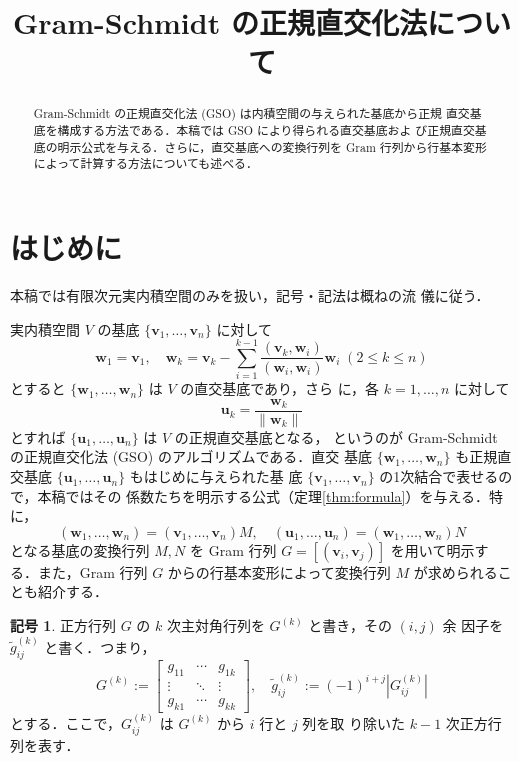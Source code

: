 \documentclass[11pt, uplatex, dvipdfmx]{jsarticle}
\title{Gram-Schmidt の正規直交化法について}
\date{}
\theoremstyle{definition}
\newtheorem*{notation}{記号}
\begin{document}
\maketitle

\begin{abstract}
  Gram-Schmidt の正規直交化法 (GSO) は内積空間の与えられた基底から正規
  直交基底を構成する方法である．本稿では GSO により得られる直交基底およ
  び正規直交基底の明示公式を与える．さらに，直交基底への変換行列を Gram
  行列から行基本変形によって計算する方法についても述べる．
\end{abstract}

\section{はじめに}

本稿では有限次元実内積空間のみを扱い，記号・記法は概ね\cite{miyake}の流
儀に従う．

実内積空間 $V$ の基底 $\{\bm{v}_1, \ldots, \bm{v}_n\}$ に対して
\[
  \bm{w}_1 = \bm{v}_1, \quad \bm{w}_k = \bm{v}_k - \sum_{i=1}^{k-1}
  \frac{(\bm{v}_k, \bm{w}_i)}{(\bm{w}_i, \bm{w}_i)} \bm{w}_i \; (2 \leq k
  \leq n)
\]
とすると $\{\bm{w}_1, \ldots, \bm{w}_n\}$ は $V$ の直交基底であり，さら
に，各 $k=1, \ldots, n$ に対して
\[
  \bm{u}_k = \frac{\bm{w}_k}{\|\bm{w}_k\|}
\]
とすれば $\{\bm{u}_1, \ldots, \bm{u}_n\}$ は $V$ の正規直交基底となる，
というのが Gram-Schmidt の正規直交化法 (GSO) のアルゴリズムである．直交
基底 $\{\bm{w}_1, \ldots, \bm{w}_n\}$ も正規直交基底
$\{\bm{u}_1, \ldots, \bm{u}_n\}$ もはじめに与えられた基
底 $\{\bm{v}_1, \ldots, \bm{v}_n\}$ の1次結合で表せるので，本稿ではその
係数たちを明示する公式（定理\ref{thm:formula}）を与える．特に，
\[
  (\bm{w}_1, \ldots, \bm{w}_n) = (\bm{v}_1, \ldots, \bm{v}_n) M, \quad
  (\bm{u}_1, \ldots, \bm{u}_n) = (\bm{w}_1, \ldots, \bm{w}_n)N
\]
となる基底の変換行列 $M, N $ を Gram 行列 $G=\left[(\bm{v}_i,
  \bm{v}_j)\right]$ を用いて明示する．また，Gram 行列 $G$
からの行基本変形によって変換行列 $M$ が求められることも紹介する．


\begin{notation}
  正方行列 $G$ の $k$ 次主対角行列を $G^{(k)}$ と書き，その $(i,j)$ 余
  因子を $\tilde{g}^{(k)}_{ij}$ と書く．つまり，
  \[
    G^{(k)} := \left[
      \begin{array}{ccc}
        g_{11} & \cdots & g_{1k}\\
        \vdots & \ddots & \vdots\\
        g_{k1} & \cdots & g_{kk}
      \end{array}
    \right], \quad \tilde{g}^{(k)}_{ij} := (-1)^{i+j} \left|G^{(k)}_{ij}\right|
  \]
  とする．ここで，$G^{(k)}_{ij}$ は $G^{(k)}$ から $i$ 行と $j$ 列を取
  り除いた $k-1$ 次正方行列を表す．
\end{notation}
\end{document}
